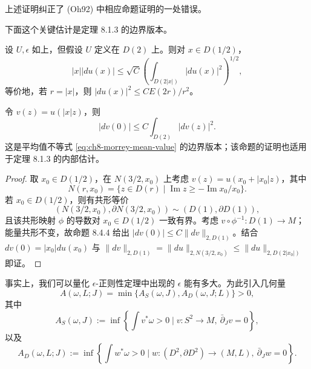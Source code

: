 \begin{remark}\label{rem:ch8-rectifies-oh92}
上述证明纠正了 (Oh92) 中相应命题证明的一处错误。
\end{remark}

下面这个关键估计是定理 8.1.3 的边界版本。
\begin{proposition}[边界能量密度估计]\label{prop:ch8-boundary-energy-density}
设 $U,\epsilon$ 如上，但假设 $U$ 定义在 $D(2)$ 上。则对 $x\in D(1/2)$，
\[
 |x||du(x)|\leq\sqrt C\left(\int_{D(2|x|)}|du(x)|^2\right)^{1/2},
\]
等价地，若 $r=|x|$，则 $|du(x)|^2\leq CE(2r)/r^2$。
\end{proposition}

\begin{remark}\label{rem:ch8-boundary-mean-value}
令 $v(z)=u(|x|z)$，则
\begin{equation}
 |dv(0)|\leq C\int_{D(2)}|dv(z)|^2.
 \label{eq:ch8-boundary-mean-value}
\end{equation}
这是平均值不等式 \eqref{eq:ch8-morrey-mean-value} 的边界版本；该命题的证明也适用于定理 8.1.3 的内部估计。
\end{remark}
\begin{proof}
取 $x_0\in D(1/2)$，在
$N(3/2,x_0)$ 上考虑 $v(z)=u(x_0+|x_0|z)$，其中
\[
 N(r,x_0)=\{z\in D(r)\mid\operatorname{Im}z\geq-\operatorname{Im}x_0/x_0\}.
\]
若 $x_0\in D(1/2)$，则有共形等价
\[
 (N(3/2,x_0),\partial N(3/2,x_0))\sim(D(1),\partial D(1)),
\]
且该共形映射 $\phi$ 的导数对 $x_0\in D(1/2)$ 一致有界。考虑
$v\circ\phi^{-1}:D(1)\to M$；能量共形不变，故命题 8.4.4 给出
$|dv(0)|\leq C\|dv\|_{2,D(1)}$。结合 $dv(0)=|x_0|du(x_0)$ 与
$\|dv\|_{2,D(1)}=\|du\|_{2,N(3/2,x_0)}
\leq\|du\|_{2,D(2|x_0|)}$ 即证。
\end{proof}

事实上，我们可以量化 $\epsilon$-正则性定理中出现的 $\epsilon$ 能有多大。为此引入几何量
\begin{equation}
 A(\omega,L;J)=\min\{A_S(\omega,J),A_D(\omega,J;L)\}>0,
 \label{eq:ch8-minimal-bubbling-energy}
\end{equation}
其中
\[
 A_S(\omega,J):=\inf\left\{\int v^*\omega>0\mid
 v:S^2\to M,\ \bar\partial_Jv=0\right\},
\]
以及
\[
 A_D(\omega,L;J):=\inf\left\{\int w^*\omega>0\mid
 w:(D^2,\partial D^2)\to(M,L),\ \bar\partial_Jw=0\right\}.
\]

